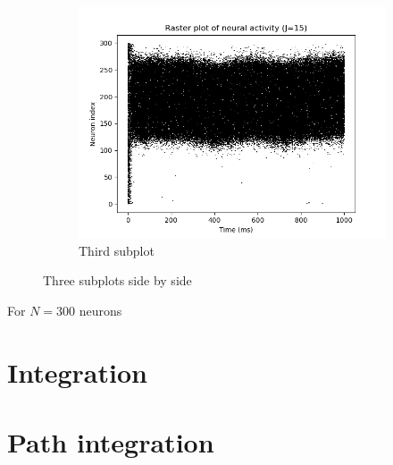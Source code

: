 \documentclass{article}
\begin{document}
\begin{figure}[h!]
  \hfill
  \begin{subfigure}[b]{0.32\textwidth}
    \includegraphics[width=\textwidth]{figures/1.1.raster_plot_J15.png}
    \caption{Third subplot}
    \label{fig:sub3}
  \end{subfigure}
  \caption{Three subplots side by side}
  \label{fig:test}
\end{figure}

For \(N=300\) neurons

\section{Integration}

\section{Path integration}
\end{document}
